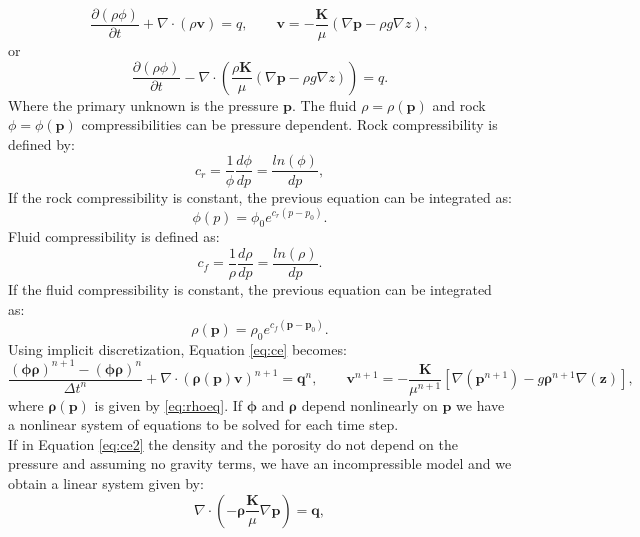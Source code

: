 \documentclass[12pt]{article}
\numberwithin{equation}{section}
\begin{document}
\begin{equation}\label{eq:ce}
\frac{\partial (\rho \phi)}{\partial t}+ \nabla \cdot ( \rho \mathbf{v})=q, \qquad \mathbf{v}=-\frac{\mathbf{K}}{\mu}(\nabla \mathbf{p}-\rho g\nabla z),
\end{equation}
or
\begin{equation}\label{eq:ce1}
\frac{\partial (\rho \phi)}{\partial t}- \nabla \cdot \left( \frac{\rho\mathbf{K}}{\mu}(\nabla \mathbf{p}-\rho g\nabla z)\right)=q.
\end{equation}
Where the primary unknown is the pressure $\mathbf{p}$.  The fluid  $\rho=\rho(\mathbf{p})$ and rock $\phi=\phi(\mathbf{p})$ compressibilities can be pressure dependent.
Rock compressibility is defined by:
\begin{equation*}
 c_r=\frac{1}{\phi}\frac{d\phi}{dp}=\frac{ln(\phi)}{dp},
\end{equation*}
If the rock compressibility is constant, the previous equation can be integrated as:
\begin{equation*}
 \phi(p)=\phi_0 e^{c_r(p-p_0)}.
\end{equation*}
Fluid compressibility is defined as:
\begin{equation}\label{eq:fc}
 c_f=\frac{1}{\rho}\frac{d\rho}{dp}=\frac{ln(\rho)}{dp}.
\end{equation}
If the fluid compressibility is constant, the previous equation can be integrated as:
\begin{equation}\label{eq:rhoeq}
 \rho(\mathbf{p})=\rho_0 e^{c_f(\mathbf{p}-\mathbf{p}_0)}.
\end{equation}
Using implicit discretization, Equation \eqref{eq:ce} becomes:
\begin{equation}\label{eq:ce2}
 \frac{(\mathbf{\phi}\mathbf{\rho})^{n+1}-(\mathbf{\phi}\mathbf{\rho})^{n}}{\Delta t^n}
 +\nabla \cdot (\mathbf{\rho}(\mathbf{p}) \mathbf{v})^{n+1}=\mathbf{q}^{n},
\qquad
\mathbf{v}^{n+1}= -\frac{\mathbf{K}}{\mu^{n+1}}[\nabla(\mathbf{p}^{n+1})-g\mathbf{\rho}^{n+1}\nabla(\mathbf{z})],
\end{equation}
where $\mathbf{\rho}(\mathbf{p})$ is given by \ref{eq:rhoeq}.
If $\mathbf{\phi}$ and $\mathbf{\rho}$ depend nonlinearly on $\mathbf{p}$ we have a nonlinear system 
of equations to be solved for each time step.  \\
If in Equation \eqref{eq:ce2} the density and the porosity do not depend on the pressure and assuming no gravity terms, we have an incompressible model and we obtain a linear system given by:
\begin{equation}\label{eq:cel}
\nabla \cdot \left( -\mathbf{\rho}\frac{\mathbf{K}}{\mu}\nabla\mathbf{p}\right)=\mathbf{q},
\end{equation}
\end{document}
